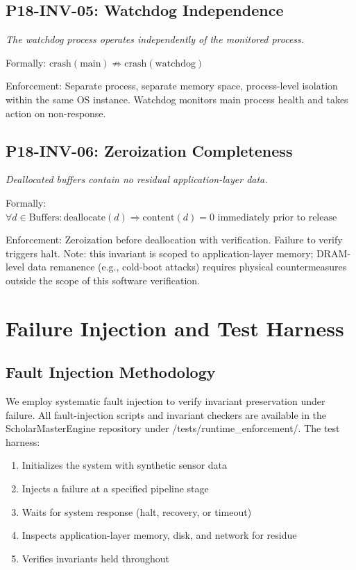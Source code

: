 \documentclass[conference]{IEEEtran}
\begin{document}
\subsection{P18-INV-05: Watchdog Independence}
\textit{The watchdog process operates independently of the monitored process.}

Formally: $\text{crash}(\text{main}) \not\Rightarrow \text{crash}(\text{watchdog})$

Enforcement: Separate process, separate memory space, process-level isolation within the same OS instance. Watchdog monitors main process health and takes action on non-response.

\subsection{P18-INV-06: Zeroization Completeness}
\textit{Deallocated buffers contain no residual application-layer data.}

Formally: $\forall d \in \text{Buffers}: \text{deallocate}(d) \Rightarrow \text{content}(d) = 0 \text{ immediately prior to release}$

Enforcement: Zeroization before deallocation with verification. Failure to verify triggers halt. Note: this invariant is scoped to application-layer memory; DRAM-level data remanence (e.g., cold-boot attacks) requires physical countermeasures outside the scope of this software verification.

\section{Failure Injection and Test Harness}

\subsection{Fault Injection Methodology}
We employ systematic fault injection to verify invariant preservation under failure. All fault-injection scripts and invariant checkers are available in the ScholarMasterEngine repository under /tests/runtime\_enforcement/. The test harness:
\begin{enumerate}
    \item Initializes the system with synthetic sensor data
    \item Injects a failure at a specified pipeline stage
    \item Waits for system response (halt, recovery, or timeout)
    \item Inspects application-layer memory, disk, and network for residue
    \item Verifies invariants held throughout
\end{enumerate}
\end{document}
